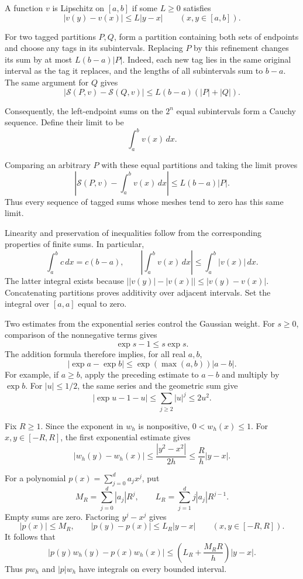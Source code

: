 A function $v$ is Lipschitz on $[a,b]$ if some $L\geq0$ satisfies
\[
 |v(y)-v(x)|\leq L|y-x|
 \qquad(x,y\in[a,b]).
\]

For two tagged partitions $P,Q$, form a partition containing both sets
of endpoints and choose any tags in its subintervals.
Replacing $P$ by this refinement changes its sum by at most
$L(b-a)|P|$.
Indeed, each new tag lies in the same original interval as the tag it
replaces, and the lengths of all subintervals sum to $b-a$.
The same argument for $Q$ gives
\[
 |\mathcal S(P,v)-\mathcal S(Q,v)|
 \leq L(b-a)(|P|+|Q|).
\]

Consequently, the left-endpoint sums on the $2^n$ equal subintervals
form a Cauchy sequence.
Define their limit to be
\[
 \int_a^b v(x)\,dx.
\]

Comparing an arbitrary $P$ with these equal partitions and taking the
limit proves
\[
 \left|\mathcal S(P,v)-\int_a^b v(x)\,dx\right|
 \leq L(b-a)|P|.
\]
Thus every sequence of tagged sums whose meshes tend to zero has this
same limit.

Linearity and preservation of inequalities follow from the corresponding
properties of finite sums.
In particular,
\[
 \int_a^b c\,dx=c(b-a),
 \qquad
 \left|\int_a^b v(x)\,dx\right|
 \leq\int_a^b |v(x)|\,dx.
\]
The latter integral exists because
$\bigl||v(y)|-|v(x)|\bigr|\leq|v(y)-v(x)|$.
Concatenating partitions proves additivity over adjacent intervals.
Set the integral over $[a,a]$ equal to zero.

Two estimates from the exponential series control the Gaussian weight.
For $s\geq0$, comparison of the nonnegative terms gives
\[
 \exp s-1\leq s\exp s.
\]
The addition formula therefore implies, for all real $a,b$,
\[
 |\exp a-\exp b|
 \leq \exp(\max(a,b))|a-b|.
\]
For example, if $a\geq b$, apply the preceding estimate to $a-b$
and multiply by $\exp b$.
For $|u|\leq1/2$, the same series and the geometric sum give
\begin{equation}
 \label{eq:gaussian-exponential-remainder}
 |\exp u-1-u|
 \leq\sum_{j\geq2}|u|^j
 \leq2u^2.
\end{equation}

Fix $R\geq1$.
Since the exponent in $w_h$ is nonpositive, $0<w_h(x)\leq1$.
For $x,y\in[-R,R]$, the first exponential estimate gives
\[
 |w_h(y)-w_h(x)|
 \leq\frac{|y^2-x^2|}{2h}
 \leq\frac Rh|y-x|.
\]

For a polynomial $p(x)=\sum_{j=0}^d a_jx^j$, put
\[
 M_R=\sum_{j=0}^d|a_j|R^j,
 \qquad
 L_R=\sum_{j=1}^d j|a_j|R^{j-1}.
\]
Empty sums are zero.
Factoring $y^j-x^j$ gives
\[
 |p(x)|\leq M_R,
 \qquad
 |p(y)-p(x)|\leq L_R|y-x|
 \qquad(x,y\in[-R,R]).
\]
It follows that
\[
 |p(y)w_h(y)-p(x)w_h(x)|
 \leq\left(L_R+\frac{M_RR}{h}\right)|y-x|.
\]
Thus $p w_h$ and $|p|w_h$ have integrals on every bounded interval.

